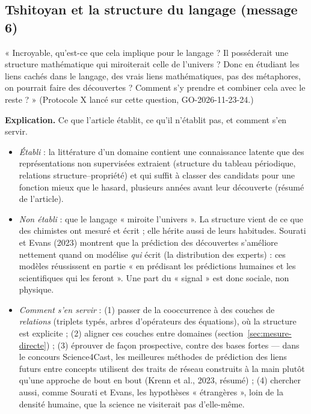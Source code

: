 \documentclass[a4paper,11pt]{article}
\begin{document}
\subsection{Tshitoyan et la structure du langage (message 6)}\label{sec:tshitoyan}
\begin{enonce}
« Incroyable, qu'est-ce que cela implique pour le langage ? Il posséderait une structure mathématique qui miroiterait celle de l'univers ? Donc en étudiant les liens cachés dans le langage, des vrais liens mathématiques, pas des métaphores, on pourrait faire des découvertes ? Comment s'y prendre et combiner cela avec le reste ? » (Protocole X lancé sur cette question, GO-2026-11-23-24.)
\end{enonce}

\textbf{Explication.} Ce que l'article établit, ce qu'il n'établit pas, et comment s'en servir.
\begin{itemize}[itemsep=1pt]
\item \emph{Établi} : la littérature d'un domaine contient une connaissance latente que des représentations non supervisées extraient (structure du tableau périodique, relations structure–propriété) et qui suffit à classer des candidats pour une fonction mieux que le hasard, plusieurs années avant leur découverte (résumé de l'article).
\item \emph{Non établi} : que le langage « miroite l'univers ». La structure vient de ce que des chimistes ont mesuré et écrit ; elle hérite aussi de leurs habitudes. Sourati et Evans (2023) montrent que la prédiction des découvertes s'améliore nettement quand on modélise \emph{qui} écrit (la distribution des experts) : ces modèles réussissent en partie « en prédisant les prédictions humaines et les scientifiques qui les feront ». Une part du « signal » est donc sociale, non physique.
\item \emph{Comment s'en servir} : (1) passer de la cooccurrence à des couches de \emph{relations} (triplets typés, arbres d'opérateurs des équations), où la structure est explicite ; (2) aligner ces couches entre domaines (section~\ref{sec:mesure-directe}) ; (3) éprouver de façon prospective, contre des bases fortes — dans le concours Science4Cast, les meilleures méthodes de prédiction des liens futurs entre concepts utilisent des traits de réseau construits à la main plutôt qu'une approche de bout en bout (Krenn et al., 2023, résumé) ; (4) chercher aussi, comme Sourati et Evans, les hypothèses « étrangères », loin de la densité humaine, que la science ne visiterait pas d'elle-même.
\end{itemize}
\end{document}
